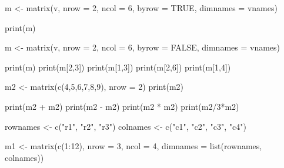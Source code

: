 \documentclass[
]{article}
\newenvironment{Shaded}{\begin{snugshade}}{\end{snugshade}}
\newcommand{\AttributeTok}[1]{\textcolor[rgb]{0.77,0.63,0.00}{#1}}
\newcommand{\ConstantTok}[1]{\textcolor[rgb]{0.00,0.00,0.00}{#1}}
\newcommand{\DecValTok}[1]{\textcolor[rgb]{0.00,0.00,0.81}{#1}}
\newcommand{\FunctionTok}[1]{\textcolor[rgb]{0.00,0.00,0.00}{#1}}
\newcommand{\NormalTok}[1]{#1}
\newcommand{\OtherTok}[1]{\textcolor[rgb]{0.56,0.35,0.01}{#1}}
\newcommand{\SpecialCharTok}[1]{\textcolor[rgb]{0.00,0.00,0.00}{#1}}
\newcommand{\StringTok}[1]{\textcolor[rgb]{0.31,0.60,0.02}{#1}}
\begin{document}
\begin{Shaded}
\begin{Highlighting}[]
\NormalTok{m }\OtherTok{\textless{}{-}} \FunctionTok{matrix}\NormalTok{(v, }\AttributeTok{nrow =} \DecValTok{2}\NormalTok{, }\AttributeTok{ncol =} \DecValTok{6}\NormalTok{, }\AttributeTok{byrow =} \ConstantTok{TRUE}\NormalTok{, }\AttributeTok{dimnames =}\NormalTok{ vnames)}

\FunctionTok{print}\NormalTok{(m)}

\NormalTok{m }\OtherTok{\textless{}{-}} \FunctionTok{matrix}\NormalTok{(v, }\AttributeTok{nrow =} \DecValTok{2}\NormalTok{, }\AttributeTok{ncol =} \DecValTok{6}\NormalTok{, }\AttributeTok{byrow =} \ConstantTok{FALSE}\NormalTok{, }\AttributeTok{dimnames =}\NormalTok{ vnames)}

\FunctionTok{print}\NormalTok{(m)}
\FunctionTok{print}\NormalTok{(m[}\DecValTok{2}\NormalTok{,}\DecValTok{3}\NormalTok{])}
\FunctionTok{print}\NormalTok{(m[}\DecValTok{1}\NormalTok{,}\DecValTok{3}\NormalTok{])}
\FunctionTok{print}\NormalTok{(m[}\DecValTok{2}\NormalTok{,}\DecValTok{6}\NormalTok{])}
\FunctionTok{print}\NormalTok{(m[}\DecValTok{1}\NormalTok{,}\DecValTok{4}\NormalTok{])}

\NormalTok{m2 }\OtherTok{\textless{}{-}} \FunctionTok{matrix}\NormalTok{(}\FunctionTok{c}\NormalTok{(}\DecValTok{4}\NormalTok{,}\DecValTok{5}\NormalTok{,}\DecValTok{6}\NormalTok{,}\DecValTok{7}\NormalTok{,}\DecValTok{8}\NormalTok{,}\DecValTok{9}\NormalTok{), }\AttributeTok{nrow =} \DecValTok{2}\NormalTok{)}
\FunctionTok{print}\NormalTok{(m2)}

\FunctionTok{print}\NormalTok{(m2 }\SpecialCharTok{+}\NormalTok{ m2)}
\FunctionTok{print}\NormalTok{(m2 }\SpecialCharTok{{-}}\NormalTok{ m2)}
\FunctionTok{print}\NormalTok{(m2 }\SpecialCharTok{*}\NormalTok{ m2) }
\FunctionTok{print}\NormalTok{(m2}\SpecialCharTok{/}\DecValTok{3}\SpecialCharTok{*}\NormalTok{m2) }

\NormalTok{rownames }\OtherTok{\textless{}{-}} \FunctionTok{c}\NormalTok{(}\StringTok{"r1"}\NormalTok{, }\StringTok{"r2"}\NormalTok{, }\StringTok{"r3"}\NormalTok{)}
\NormalTok{colnames }\OtherTok{\textless{}{-}} \FunctionTok{c}\NormalTok{(}\StringTok{"c1"}\NormalTok{, }\StringTok{"c2"}\NormalTok{, }\StringTok{"c3"}\NormalTok{,  }\StringTok{"c4"}\NormalTok{)}

\NormalTok{m1 }\OtherTok{\textless{}{-}} \FunctionTok{matrix}\NormalTok{(}\FunctionTok{c}\NormalTok{(}\DecValTok{1}\SpecialCharTok{:}\DecValTok{12}\NormalTok{), }\AttributeTok{nrow =} \DecValTok{3}\NormalTok{, }\AttributeTok{ncol =} \DecValTok{4}\NormalTok{, }\AttributeTok{dimnames =} \FunctionTok{list}\NormalTok{(rownames, colnames))}


\end{Highlighting}
\end{Shaded}
\end{document}
